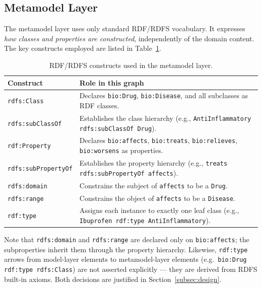 \documentclass[11pt,a4paper]{article}
\begin{document}
\subsection{Metamodel Layer}

The metamodel layer uses only standard RDF/RDFS vocabulary.  It expresses
\emph{how classes and properties are constructed}, independently of the domain
content.  The key constructs employed are listed in
Table~\ref{tab:metamodel}.

\begin{table}[h!]
\centering
\caption{RDF/RDFS constructs used in the metamodel layer.}
\label{tab:metamodel}
\begin{tabular}{@{}lp{9cm}@{}}
\toprule
\textbf{Construct} & \textbf{Role in this graph} \\
\midrule
\texttt{rdfs:Class}           & Declares \texttt{bio:Drug}, \texttt{bio:Disease}, and all subclasses as RDF classes. \\
\texttt{rdfs:subClassOf}      & Establishes the class hierarchy (e.g., \texttt{AntiInflammatory rdfs:subClassOf Drug}). \\
\texttt{rdf:Property}         & Declares \texttt{bio:affects}, \texttt{bio:treats}, \texttt{bio:relieves}, \texttt{bio:worsens} as properties. \\
\texttt{rdfs:subPropertyOf}   & Establishes the property hierarchy (e.g., \texttt{treats rdfs:subPropertyOf affects}). \\
\texttt{rdfs:domain}          & Constrains the subject of \texttt{affects} to be a \texttt{Drug}. \\
\texttt{rdfs:range}           & Constrains the object of \texttt{affects} to be a \texttt{Disease}. \\
\texttt{rdf:type}             & Assigns each instance to exactly one leaf class (e.g., \texttt{Ibuprofen rdf:type AntiInflammatory}). \\
\bottomrule
\end{tabular}
\end{table}

\noindent Note that \texttt{rdfs:domain} and \texttt{rdfs:range} are declared
only on \texttt{bio:affects}; the subproperties inherit them through the
property hierarchy.  Likewise, \texttt{rdf:type} arrows from model-layer
elements to metamodel-layer elements (e.g.\ \texttt{bio:Drug rdf:type
rdfs:Class}) are not asserted explicitly — they are derived from RDFS
built-in axioms.  Both decisions are justified in
Section~\ref{subsec:design}.
\end{document}
